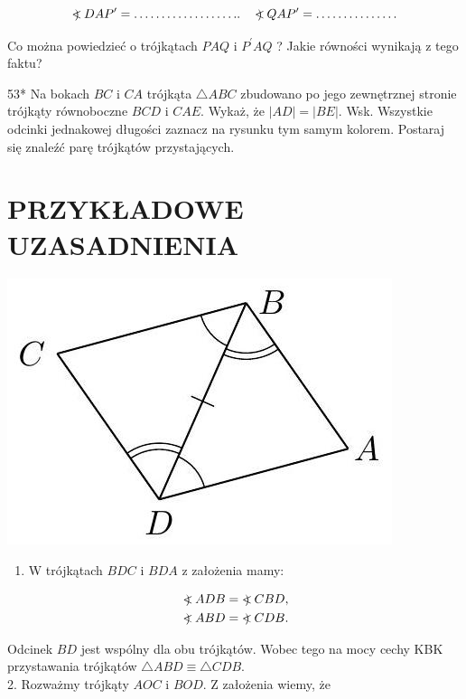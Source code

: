 \documentclass[10pt]{article}
\newcommand\Varangle{\mathop{{<\!\!\!\!\!\text{\small)}}\:}\nolimits}
\begin{document}
\[
\Varangle D A P^{\prime}=\ldots \ldots \ldots \ldots \ldots \ldots . . \quad \Varangle Q A P^{\prime}=\ldots \ldots \ldots \ldots \ldots
\]

Co można powiedzieć o trójkątach \(P A Q\) i \(P^{\prime} A Q\) ? Jakie równości wynikają z tego faktu?

53* Na bokach \(B C\) i \(C A\) trójkąta \(\triangle A B C\) zbudowano po jego zewnętrznej stronie trójkąty równoboczne \(B C D\) i \(C A E\). Wykaż, że \(|A D|=|B E|\). Wsk. Wszystkie odcinki jednakowej długości zaznacz na rysunku tym samym kolorem. Postaraj się znaleźć parę trójkątów przystających.

\section*{PRZYKŁADOWE UZASADNIENIA}
\begin{center}
\includegraphics[max width=\textwidth]{2024_11_21_71f62bd117d375398909g-058}
\end{center}

\begin{enumerate}
  \item W trójkątach \(B D C\) i \(B D A\) z założenia mamy:
\end{enumerate}

\[
\begin{aligned}
& \Varangle A D B=\Varangle C B D, \\
& \Varangle A B D=\Varangle C D B .
\end{aligned}
\]

Odcinek \(B D\) jest wspólny dla obu trójkątów. Wobec tego na mocy cechy KBK przystawania trójkątów \(\triangle A B D \equiv \triangle C D B\).\\
2. Rozważmy trójkąty \(A O C\) i \(B O D\). Z założenia wiemy, że
\end{document}
